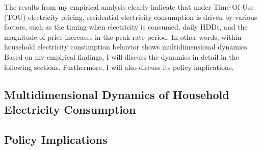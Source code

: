 The results from my empirical analysis clearly indicate that under Time-Of-Use (TOU) electricity pricing, residential electricity consumption is driven by various factors, such as the timing when electricity is consumed, daily HDDs, and the magnitude of price increases in the peak rate period. In other words, within-household electricity consumption behavior shows multidimensional dynamics. Based on my empirical findings, I will discuss the dynamics in detail in the following sections. Furthermore, I will also discuss its policy implications. 

\subsection{Multidimensional Dynamics of Household Electricity Consumption}
\label{Subsection:Multidimensional-Dynamics-of-Household-Electricity-Consumption}



\subsection{Policy Implications}
\label{Subsection:Policy-Implications}


